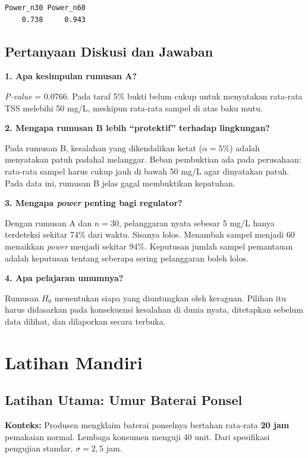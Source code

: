 \documentclass[
  indonesian,
  letterpaper,
]{book}
\begin{document}
\begin{verbatim}
Power_n30 Power_n60 
    0.738     0.943 
\end{verbatim}

\section{Pertanyaan Diskusi dan
Jawaban}\label{pertanyaan-diskusi-dan-jawaban-1}

\textbf{1. Apa kesimpulan rumusan A?}

\emph{P-value} = 0.0766. Pada taraf 5\% bukti belum cukup untuk
menyatakan rata-rata TSS melebihi 50 mg/L, meskipun rata-rata sampel di
atas baku mutu.

\textbf{2. Mengapa rumusan B lebih ``protektif'' terhadap lingkungan?}

Pada rumusan B, kesalahan yang dikendalikan ketat (\(\alpha = 5\%\))
adalah menyatakan patuh padahal melanggar. Beban pembuktian ada pada
perusahaan: rata-rata sampel harus cukup jauh di bawah 50 mg/L agar
dinyatakan patuh. Pada data ini, rumusan B jelas gagal membuktikan
kepatuhan.

\textbf{3. Mengapa \emph{power} penting bagi regulator?}

Dengan rumusan A dan \(n = 30\), pelanggaran nyata sebesar 5 mg/L hanya
terdeteksi sekitar 74\% dari waktu. Sisanya lolos. Menambah sampel
menjadi 60 menaikkan \emph{power} menjadi sekitar 94\%. Keputusan jumlah
sampel pemantauan adalah keputusan tentang seberapa sering pelanggaran
boleh lolos.

\textbf{4. Apa pelajaran umumnya?}

Rumusan \(H_0\) menentukan siapa yang diuntungkan oleh keraguan. Pilihan
itu harus didasarkan pada konsekuensi kesalahan di dunia nyata,
ditetapkan sebelum data dilihat, dan dilaporkan secara terbuka.


\chapter{Latihan Mandiri}\label{latihan-mandiri-1}

\section{Latihan Utama: Umur Baterai
Ponsel}\label{latihan-utama-umur-baterai-ponsel}

\textbf{Konteks:} Produsen mengklaim baterai ponselnya bertahan
rata-rata \textbf{20 jam} pemakaian normal. Lembaga konsumen menguji 40
unit. Dari spesifikasi pengujian standar, \(\sigma = 2{,}5\) jam.
\end{document}
